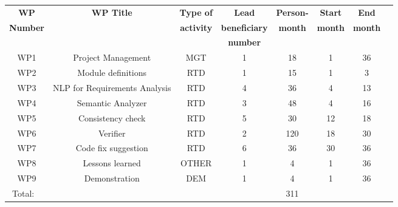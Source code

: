 \begin{center}
	\begin{adjustbox}{width=1\textwidth}
			\begin{tabular}{ |c|c|c|c|c|c|c|c|} 
			\hline
			\textbf{WP} & \textbf{WP Title} & \textbf{Type of} & \textbf{Lead} & \textbf{Person-} & \textbf{Start} & \textbf{End} \\
			\textbf{Number} & \textbf{~} & \textbf{activity} & \textbf{beneficiary} & \textbf{month} & \textbf{month} & \textbf{month}  \\
			~ & ~ & ~ & \textbf{number} & ~ & ~ & ~ \\
			\hline
			
			WP1 & Project Management & MGT & 1 & 18 & 1 & 36 \\
			\hline
			
			WP2 & Module definitions & RTD & 1 & 15 & 1 & 3\\
			\hline
			
			WP3 & NLP for Requirements Analysis& RTD & 4 & 36 & 4 & 13\\
			\hline
			
			WP4 & Semantic Analyzer & RTD & 3 & 48 & 4 & 16\\
			\hline
			
			WP5 & Consistency check & RTD & 5 & 30 & 12 & 18\\
			\hline
			
			WP6 & Verifier & RTD & 2 & 120 & 18 & 30\\
			\hline
			
			WP7 & Code fix suggestion & RTD & 6 & 36 & 30 & 36\\
			\hline
			
			WP8 & Lessons learned & OTHER & 1 & 4 & 1 & 36\\
			\hline
			
			WP9 & Demonstration & DEM & 1 & 4 & 1 & 36\\
			\hline
			\hline
			
			Total: ~ & ~ & ~ & ~ & 311 & ~ &	\\
			\hline
		\end{tabular}
	\end{adjustbox}
\end{center}